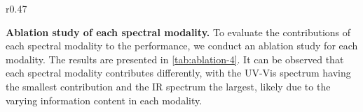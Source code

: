 \begin{wraptable}[8]{r}{0.47\linewidth}
\vspace{-10pt}
\caption{Ablation of spectral modalities.}
    \label{tab:ablation-4}
    \vspace{-6pt}
    \begin{center}
    \begin{small}
    \end{small}
    \end{center}
\end{wraptable}
\textbf{Ablation study of each spectral modality.}
To evaluate the contributions of each spectral modality to the performance, we conduct an ablation study for each modality. The results are presented in \cref{tab:ablation-4}. It can be observed that each spectral modality contributes differently, with the UV-Vis spectrum having the smallest contribution and the IR spectrum the largest, likely due to the varying information content in each modality.